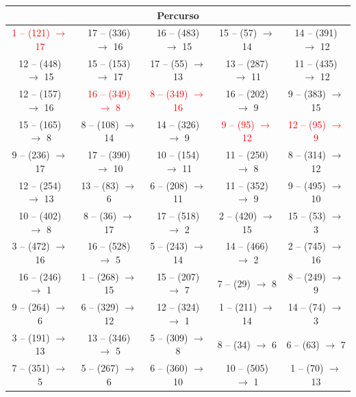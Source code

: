 \begin{table}[H]
    \centering
    \scriptsize
    \begin{tabular}{|c|c|c|c|c|}
        \hline
        \multicolumn{5}{|c|}{Percurso} \\ \hline
    \textcolor{red}{1 -- (121) $\rightarrow$ 17} & 17 -- (336) $\rightarrow$ 16 & 16 -- (483) $\rightarrow$ 15 & 15 -- (57) $\rightarrow$ 14 & 14 -- (391) $\rightarrow$ 12 \\
    12 -- (448) $\rightarrow$ 15 & 15 -- (153) $\rightarrow$ 17 & 17 -- (55) $\rightarrow$ 13 & 13 -- (287) $\rightarrow$ 11 & 11 -- (435) $\rightarrow$ 12 \\
    12 -- (157) $\rightarrow$ 16 & \textcolor{red}{16 -- (349) $\rightarrow$ 8} & \textcolor{red}{8 -- (349) $\rightarrow$ 16} & 16 -- (202) $\rightarrow$ 9 & 9 -- (383) $\rightarrow$ 15 \\
    15 -- (165) $\rightarrow$ 8 & 8 -- (108) $\rightarrow$ 14 & 14 -- (326) $\rightarrow$ 9 & \textcolor{red}{9 -- (95) $\rightarrow$ 12} & \textcolor{red}{12 -- (95) $\rightarrow$ 9} \\
    9 -- (236) $\rightarrow$ 17 & 17 -- (390) $\rightarrow$ 10 & 10 -- (154) $\rightarrow$ 11 & 11 -- (250) $\rightarrow$ 8 & 8 -- (314) $\rightarrow$ 12 \\
    12 -- (254) $\rightarrow$ 13 & 13 -- (83) $\rightarrow$ 6 & 6 -- (208) $\rightarrow$ 11 & 11 -- (352) $\rightarrow$ 9 & 9 -- (495) $\rightarrow$ 10 \\
    10 -- (402) $\rightarrow$ 8 & 8 -- (36) $\rightarrow$ 17 & 17 -- (518) $\rightarrow$ 2 & 2 -- (420) $\rightarrow$ 15 & 15 -- (53) $\rightarrow$ 3 \\
    3 -- (472) $\rightarrow$ 16 & 16 -- (528) $\rightarrow$ 5 & 5 -- (243) $\rightarrow$ 14 & 14 -- (466) $\rightarrow$ 2 & 2 -- (745) $\rightarrow$ 16 \\
    16 -- (246) $\rightarrow$ 1 & 1 -- (268) $\rightarrow$ 15 & 15 -- (207) $\rightarrow$ 7 & 7 -- (29) $\rightarrow$ 8 & 8 -- (249) $\rightarrow$ 9 \\
    9 -- (264) $\rightarrow$ 6 & 6 -- (329) $\rightarrow$ 12 & 12 -- (324) $\rightarrow$ 1 & 1 -- (211) $\rightarrow$ 14 & 14 -- (74) $\rightarrow$ 3 \\
    3 -- (191) $\rightarrow$ 13 & 13 -- (346) $\rightarrow$ 5 & 5 -- (309) $\rightarrow$ 8 & 8 -- (34) $\rightarrow$ 6 & 6 -- (63) $\rightarrow$ 7 \\
    7 -- (351) $\rightarrow$ 5 & 5 -- (267) $\rightarrow$ 6 & 6 -- (360) $\rightarrow$ 10 & 10 -- (505) $\rightarrow$ 1 & 1 -- (70) $\rightarrow$ 13 \\

\end{tabular}
\end{table}
